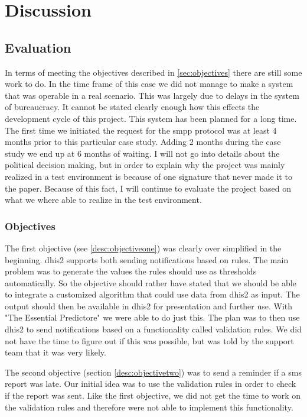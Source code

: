 \chapter{Discussion}

\section{Evaluation}
In terms of meeting the objectives described in \ref{sec:objectives} there are still some work to do.
In the time frame of this case we did not manage to make a system that was operable in a real scenario. 
This was largely due to delays in the system of bureaucracy. 
It cannot be stated clearly enough how this effects the development cycle of this project.
This system has been planned for a long time. 
The first time we initiated the request for the \gls{smpp} protocol was at least 4 months prior to this particular case study. Adding 2 months during the case study we end up at 6 months of waiting.
I will not go into details about the political decision making, but in order to explain why the project was mainly realized in a test environment is because of one signature that never made it to the paper.
Because of this fact, I will continue to evaluate the project based on what we where able to realize in the test environment.

\subsection{Objectives}
The first objective (see \ref{desc:objectiveone}) was clearly over simplified in the beginning.
\gls{dhis2} supports both sending notifications based on rules. The main problem was to generate the values the rules should use as thresholds automatically. So the objective should rather have stated that we should be able to integrate a customized algorithm that could use data from \gls{dhis2} as input. The output should then be available in \gls{dhis2} for presentation and further use. 
With "The Essential Predictore" we were able to do just this. The plan was to then use \gls{dhis2} to send notifications based on a functionality called validation rules.
We did not have the time to figure out if this was possible, but was told by the support team that it was very likely. 

The second objective (section \ref{desc:objectivetwo}) was to send a reminder if a \gls{sms} report was late. Our initial idea was to use the validation rules in order to check if the report was sent. Like the first objective, we did not get the time to work on the validation rules and therefore were not able to implement this functionality.

